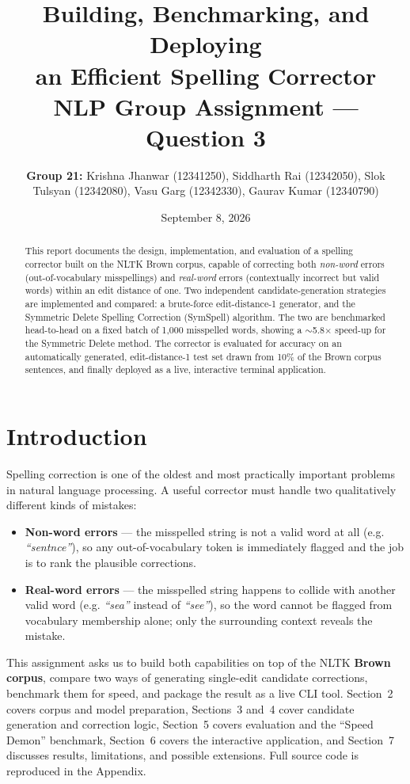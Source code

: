 \documentclass[11pt]{article}
\title{\textbf{Building, Benchmarking, and Deploying\\ an Efficient Spelling Corrector}\\[0.5em]
\large NLP Group Assignment --- Question 3}
\author{\begin{minipage}{0.85\textwidth}\centering\textbf{Group 21:} Krishna Jhanwar (12341250), Siddharth Rai (12342050), Slok Tulsyan (12342080), Vasu Garg (12342330), Gaurav Kumar (12340790)\end{minipage}}
\date{September 8, 2026}
\begin{document}
\maketitle

\begin{abstract}
This report documents the design, implementation, and evaluation of a spelling corrector built on the NLTK Brown corpus, capable of correcting both \textit{non-word} errors (out-of-vocabulary misspellings) and \textit{real-word} errors (contextually incorrect but valid words) within an edit distance of one. Two independent candidate-generation strategies are implemented and compared: a brute-force edit-distance-1 generator, and the Symmetric Delete Spelling Correction (SymSpell) algorithm. The two are benchmarked head-to-head on a fixed batch of 1,000 misspelled words, showing a $\sim$5.8$\times$ speed-up for the Symmetric Delete method. The corrector is evaluated for accuracy on an automatically generated, edit-distance-1 test set drawn from 10\% of the Brown corpus sentences, and finally deployed as a live, interactive terminal application.
\end{abstract}

\section{Introduction}

Spelling correction is one of the oldest and most practically important problems in natural language processing. A useful corrector must handle two qualitatively different kinds of mistakes:

\begin{itemize}
\item \textbf{Non-word errors} --- the misspelled string is not a valid word at all (e.g. \textit{``sentnce''}), so any out-of-vocabulary token is immediately flagged and the job is to rank the plausible corrections.
\item \textbf{Real-word errors} --- the misspelled string happens to collide with another valid word (e.g. \textit{``sea''} instead of \textit{``see''}), so the word cannot be flagged from vocabulary membership alone; only the surrounding context reveals the mistake.
\end{itemize}

This assignment asks us to build both capabilities on top of the NLTK \textbf{Brown corpus}, compare two ways of generating single-edit candidate corrections, benchmark them for speed, and package the result as a live CLI tool. Section~2 covers corpus and model preparation, Sections~3 and~4 cover candidate generation and correction logic, Section~5 covers evaluation and the ``Speed Demon'' benchmark, Section~6 covers the interactive application, and Section~7 discusses results, limitations, and possible extensions. Full source code is reproduced in the Appendix.
\end{document}
